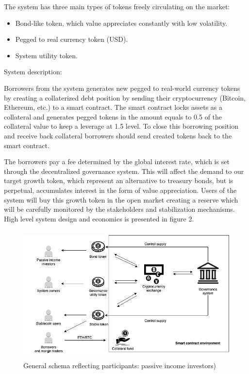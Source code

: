 \documentclass[12pt, a4paper, twocolumn]{article}
\begin{document}
The system has three main types of tokens freely circulating on the market:
\begin{itemize}
\item Bond-like token, which value appreciates constantly with low volatility.
\item Pegged to real currency token (USD).
\item System utility token.
\end{itemize}

System description:

Borrowers from the system generates new pegged to real-world currency tokens by creating a collaterized debt position by sending their cryptocurrency (Bitcoin, Ethereum, etc.) to a smart contract. The smart contract locks assets as a collateral and generates pegged tokens in the amount equals to 0.5 of the collateral value to keep a leverage at 1.5 level. To close this borrowing position and receive back collateral borrowers should send created tokens back to the smart contract.

The borrowers pay a fee determined by the global interest rate, which is set through the decentralized governance system. This will affect the demand to our target growth token, which represent an alternative to treasury bonds, but is perpetual, accumulates interest in the form of value appreciation. Users of the system will buy this growth token in the open market creating a reserve which will be carefully monitored by the stakeholders and stabilization mechanisms. High level system design and economics is presented in figure 2.








\begin{figure}
  \includegraphics[width=\textwidth,height=7cm]{GeneralSchema.png}
  \caption{General schema reflecting participants: passive income investors)}
\end{figure}
\end{document}
